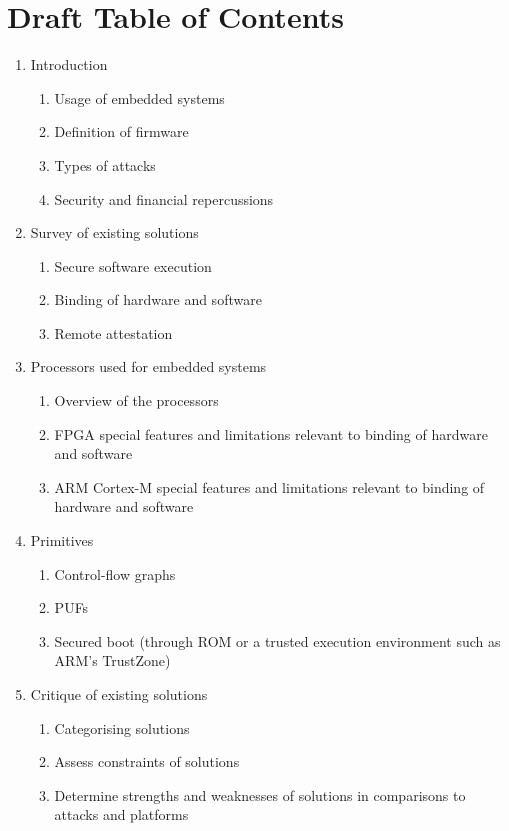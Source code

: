 \documentclass[10pt]{report}
\begin{document}
\chapter*{Draft Table of Contents}
\begin{enumerate}
	\item Introduction
		\begin{enumerate}[{1.}1]
			\item Usage of embedded systems	
			\item Definition of firmware	
			\item Types of attacks
			\item Security and financial repercussions 
		\end{enumerate}
	\item Survey of existing solutions
		\begin{enumerate}[{2.}1]
			\item Secure software execution
			\item Binding of hardware and software
			\item Remote attestation
		\end{enumerate}
	\item Processors used for embedded systems
		\begin{enumerate}[{3.}1]
			\item Overview of the processors
			\item FPGA special features and limitations relevant to binding of hardware and software
			\item ARM Cortex-M special features and limitations relevant to binding of hardware and software
		\end{enumerate}
	\item Primitives
		\begin{enumerate}[{4.}1]
			\item Control-flow graphs
			\item PUFs
			\item Secured boot (through ROM or a trusted execution environment such as ARM's TrustZone)			
		\end{enumerate}
	\item Critique of existing solutions
		\begin{enumerate}[{5.}1]
			\item Categorising solutions
			\item Assess constraints of solutions
			\item Determine strengths and weaknesses of solutions in comparisons to attacks and platforms 

\end{enumerate}
\end{enumerate}
\end{document}
